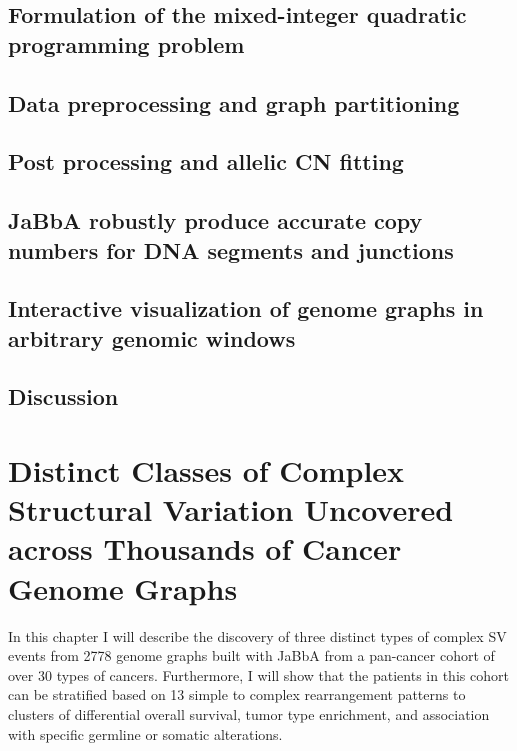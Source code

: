 \documentclass[phd,tocprelim]{cornell}
\begin{document}
\section{Formulation of the mixed-integer quadratic programming problem}


\section{Data preprocessing and graph partitioning}


\section{Post processing and allelic CN fitting}

\section{JaBbA robustly produce accurate copy numbers for DNA segments and junctions}

\section{Interactive visualization of genome graphs in arbitrary genomic windows}

\section{Discussion}

\chapter{Distinct Classes of Complex Structural Variation Uncovered across Thousands of Cancer Genome Graphs}
In this chapter I will describe the discovery of three distinct types of complex SV events from 2778 genome graphs built with JaBbA from a pan-cancer cohort of over 30 types of cancers. Furthermore, I will show that the patients in this cohort can be stratified based on 13 simple to complex rearrangement patterns to clusters of differential overall survival, tumor type enrichment, and association with specific germline or somatic alterations.
\end{document}

